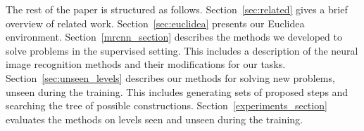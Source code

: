 The rest of the paper is structured as follows. Section~\ref{sec:related} gives a brief overview of related work.
Section~\ref{sec:euclidea} presents our Euclidea environment.
Section~\ref{mrcnn_section} describes the methods we developed to solve problems in the supervised setting. This includes a description of the neural image recognition methods and their modifications for our tasks.
Section~\ref{sec:unseen_levels} describes our methods
for solving new problems, unseen during the training.
This includes generating sets of proposed steps
and searching the tree of possible constructions. Section~\ref{experiments_section} evaluates the methods on levels seen and unseen during the training.

